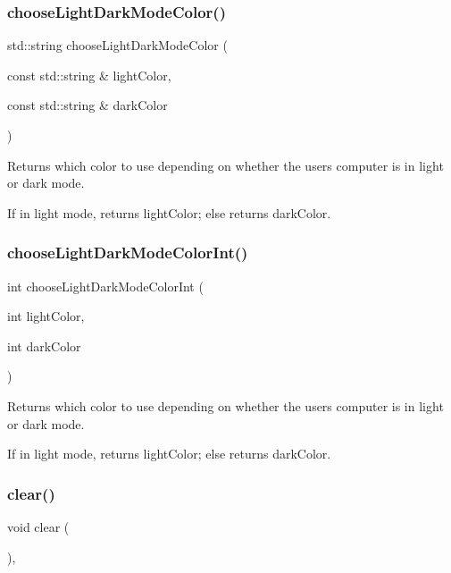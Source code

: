 \subsubsection{\texorpdfstring{choose\+Light\+Dark\+Mode\+Color()}{chooseLightDarkModeColor()}}
{\footnotesize\ttfamily std\+::string choose\+Light\+Dark\+Mode\+Color (\begin{DoxyParamCaption}\item[{const std\+::string \&}]{light\+Color,  }\item[{const std\+::string \&}]{dark\+Color }\end{DoxyParamCaption})\hspace{0.3cm}{\ttfamily [static]}}



Returns which color to use depending on whether the user\textquotesingle{}s computer is in light or dark mode. 

If in light mode, returns light\+Color; else returns dark\+Color. \mbox{\label{classGWindow_a8364f5a4c8622d07ccc83bdc3acc4f19}} 
\subsubsection{\texorpdfstring{choose\+Light\+Dark\+Mode\+Color\+Int()}{chooseLightDarkModeColorInt()}}
{\footnotesize\ttfamily int choose\+Light\+Dark\+Mode\+Color\+Int (\begin{DoxyParamCaption}\item[{int}]{light\+Color,  }\item[{int}]{dark\+Color }\end{DoxyParamCaption})\hspace{0.3cm}{\ttfamily [static]}}



Returns which color to use depending on whether the user\textquotesingle{}s computer is in light or dark mode. 

If in light mode, returns light\+Color; else returns dark\+Color. \mbox{\label{classGWindow_aee7cb2065b88d21ac4ad05bc997ecf82}} 
\subsubsection{\texorpdfstring{clear()}{clear()}}
{\footnotesize\ttfamily void clear (\begin{DoxyParamCaption}{ }\end{DoxyParamCaption})\hspace{0.3cm}{\ttfamily [override]}, {\ttfamily [virtual]}}



